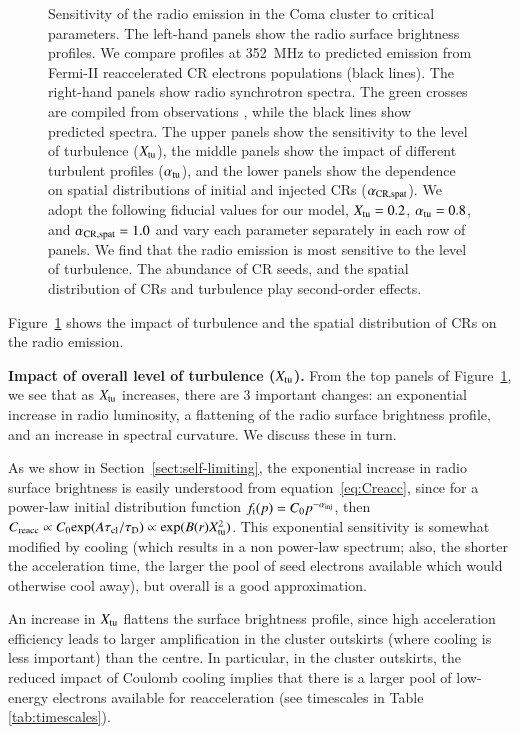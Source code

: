 \documentclass[fleqn,usenatbib,useAMS]{mnras}
\begin{document}
\begin{figure}
\caption{Sensitivity of the radio emission in the Coma cluster to critical
  parameters. The left-hand panels show the radio surface brightness
  profiles. We compare profiles at 352~MHz \citep[blue
    crosses,][]{brown11} to predicted emission from Fermi-II
  reaccelerated CR electrons populations (black lines). The right-hand
  panels show radio synchrotron spectra. The green crosses are
  compiled from observations \citep{2010PhDT.......259P}, while the
  black lines show predicted spectra. The upper panels show the sensitivity to the level of
  turbulence ($X_{\mathrm{tu}}$), the middle panels show the impact of
  different turbulent profiles ($\alpha_{\mathrm{tu}}$), and the lower
  panels show the dependence on spatial distributions of initial and
  injected CRs ($\alpha_{\mathrm{CR,spat}}$). We adopt the following
  fiducial values for our model, $X_{\mathrm{tu}}=0.2$,
  $\alpha_{\mathrm{tu}}=0.8$, and $\alpha_{\mathrm{CR,spat}}=1.0$ and vary each
  parameter separately in each row of panels. We find that the radio
  emission is most sensitive to the level of turbulence. The abundance of CR seeds, and the spatial distribution of CRs and turbulence play second-order effects.}
  \label{fig:param_comp}
\end{figure}

Figure~\ref{fig:param_comp} shows the impact of turbulence and the
spatial distribution of CRs on the radio emission. 

{\bf Impact of overall level of turbulence ($X_{\rm tu}$).} From the top panels of Figure~\ref{fig:param_comp}, we see that as $X_{\rm tu}$ increases, there are 3 important changes: an exponential increase in radio luminosity, a flattening of the radio surface brightness profile, and an increase in spectral curvature. We discuss these in turn. 

As we show in Section~\ref{sect:self-limiting}, the exponential increase in radio surface brightness is easily understood from equation~\ref{eq:Creacc}, since for a power-law initial distribution function $f_{\rm i}(p) = C_{\rm 0} p^{-\alpha_{{\mathrm{inj}}}}$, then $C_{\rm reacc} \propto C_{\rm 0} {\rm exp}(A \tau_{\rm cl}/\tau_{\rm D}) \propto {\rm exp} (B(r) X_{\rm tu}^{2})$. This exponential sensitivity is somewhat modified by cooling (which results in a non power-law spectrum; also, the shorter the acceleration time, the larger the pool of seed electrons available which would otherwise cool away), but overall is a good approximation.  

An increase in $X_{\rm tu}$ flattens the surface brightness profile, since high acceleration efficiency leads to larger amplification in the cluster outskirts (where cooling is less important) than the centre. In particular, in the cluster outskirts, the reduced impact of Coulomb cooling implies that there is a larger pool of low-energy electrons available for reacceleration (see timescales in Table \ref{tab:timescales}). 
\end{document}
